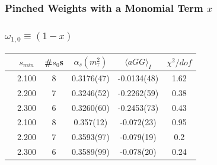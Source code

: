 \documentclass[fleqn]{beamer}
\begin{document}
\subsubsection{Pinched Weights with a Monomial Term \(x\)}
\begin{frame}
  \frametitle{\(\omega_{1,0} \equiv (1-x)\)}
  \centering
  \begin{tabular}{cccccc}
    \toprule
    & \(s_{min}\) & \#\(s_0\)s & \(\alpha_s(m_\tau^2)\) & \(\langle aGG \rangle_I\) & \(\chi^2/dof\)  \\
    \midrule
    \parbox[t]{2mm}{}
    & 2.100 & 8 & 0.3176(47) & -0.0134(48) & 1.62 \\
    & 2.200 & 7 & 0.3246(52) & -0.2262(59) & 0.38 \\
    & 2.300 & 6 & 0.3260(60) & -0.2453(73) & 0.43 \\
    \midrule
    \parbox[t]{2mm}{}
    & 2.100 & 8  & 0.357(12) & -0.072(23) & 0.95 \\
    & 2.200 & 7 &  0.3593(97) & -0.079(19) & 0.2 \\
    & 2.300 & 6 & 0.3589(99) & -0.078(20) & 0.24 \\
    \bottomrule
  \end{tabular}
\end{frame}
\end{document}
